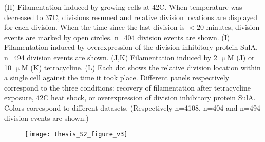 {  (H) Filamentation induced by growing cells at 42C. When temperature was decreased to 37C, divisions resumed and relative division locations are displayed for each division. When the time since the last division is $<20$ minutes, division events are marked by open circles. n=404 division events are shown. 
  (I) Filamentation induced by overexpression of the division-inhibitory protein SulA. n=494 division events are shown.
  (J,K) Filamentation induced by 2 $\upmu$M (J) or 10 $\upmu$M 
  (K) tetracycline. 
  (L) Each dot shows the relative division location within a single cell against the time it took place. Different panels respectively correspond to the three conditions: recovery of filamentation after tetracycline exposure, 42C heat shock, or overexpression of division inhibitory protein SulA.
  Colors correspond to different datasets. 
  (Respectively n=4108, n=404 and n=494 division events are shown.) 
}

\begin{figure}
	\centering
	\texttt{[image: thesis\_S2\_figure\_v3]}
\end{figure}	

\clearpage

